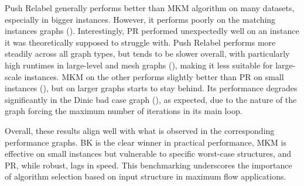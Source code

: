 Push Relabel generally performs better than MKM algorithm on many datasets, especially in bigger instances. However, it performs poorly on the matching instances graphs (). Interestingly, PR performed unexpectedly well on an instance it was theoretically supposed to struggle with. Push Relabel performs more steadily across all graph types, but tends to be slower overall, with particularly high runtimes in large-level and mesh graphs (), making it less suitable for large-scale instances. MKM on the other performs slightly better than PR on small instances (), but on larger graphs starts to stay behind. Its performance degrades significantly in the Dinic bad case graph (), as expected, due to the nature of the graph forcing the maximum number of iterations in its main loop. 

Overall, these results align well with what is observed in the corresponding performance graphs. BK is the clear winner in practical performance, MKM is effective on small instances but vulnerable to specific worst-case structures, and PR, while robust, lags in speed. This benchmarking underscores the importance of algorithm selection based on input structure in maximum flow applications.